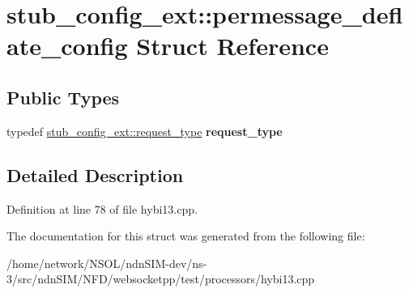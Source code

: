\hypertarget{structstub__config__ext_1_1permessage__deflate__config}{}\section{stub\+\_\+config\+\_\+ext\+:\+:permessage\+\_\+deflate\+\_\+config Struct Reference}
\label{structstub__config__ext_1_1permessage__deflate__config}
\subsection*{Public Types}
\begin{DoxyCompactItemize}
\item 
typedef \hyperlink{classwebsocketpp_1_1http_1_1parser_1_1request}{stub\+\_\+config\+\_\+ext\+::request\+\_\+type} {\bfseries request\+\_\+type}\hypertarget{structstub__config__ext_1_1permessage__deflate__config_a2873c88b37bc67f108fe532cc31810fa}{}\label{structstub__config__ext_1_1permessage__deflate__config_a2873c88b37bc67f108fe532cc31810fa}

\end{DoxyCompactItemize}


\subsection{Detailed Description}


Definition at line 78 of file hybi13.\+cpp.



The documentation for this struct was generated from the following file\+:\begin{DoxyCompactItemize}
\item 
/home/network/\+N\+S\+O\+L/ndn\+S\+I\+M-\/dev/ns-\/3/src/ndn\+S\+I\+M/\+N\+F\+D/websocketpp/test/processors/hybi13.\+cpp\end{DoxyCompactItemize}
